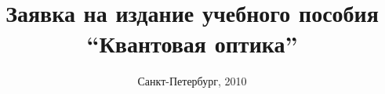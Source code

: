 \title{Заявка на издание учебного пособия \\ ``Квантовая оптика''}
\author{}
\date{Санкт-Петербург, 2010}
\maketitle
\thispagestyle{empty}
\newpage
